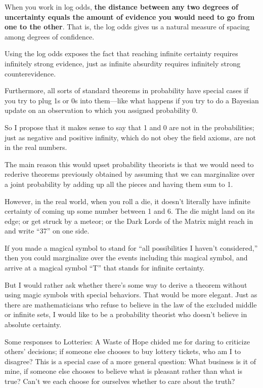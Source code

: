 {
 When you work in log odds, \textbf{the distance between any two
degrees of uncertainty equals the amount of evidence you would need to
go from one to the other}. That is, the log odds gives us a natural
measure of spacing among degrees of confidence.}

{
 Using the log odds exposes the fact that reaching infinite
certainty requires infinitely strong evidence, just as infinite
absurdity requires infinitely strong counterevidence.}

{
 Furthermore, all sorts of standard theorems in probability have
special cases if you try to plug 1s or 0s into them---like what happens
if you try to do a Bayesian update on an observation to which you
assigned probability 0.}

{
 So I propose that it makes sense to say that 1 and 0 are not in
the probabilities; just as negative and positive infinity, which do not
obey the field axioms, are not in the real numbers.}

{
 The main reason this would upset probability theorists is that we
would need to rederive theorems previously obtained by assuming that we
can marginalize over a joint probability by adding up all the pieces
and having them sum to 1.}

{
 However, in the real world, when you roll a die, it
doesn't literally have infinite certainty of coming up
some number between 1 and 6. The die might land on its edge; or get
struck by a meteor; or the Dark Lords of the Matrix might reach in and
write ``37'' on one side.}

{
 If you made a magical symbol to stand for ``all
possibilities I haven't considered,''
then you could marginalize over the events including this magical
symbol, and arrive at a magical symbol
``T'' that stands for infinite
certainty.}

{
 But I would rather ask whether there's some way to
derive a theorem without using magic symbols with special behaviors.
That would be more elegant. Just as there are mathematicians who refuse
to believe in the law of the excluded middle or infinite sets, I would
like to be a probability theorist who doesn't believe
in absolute certainty.}

\myendsectiontext


{
 Some responses to Lotteries: A Waste of Hope chided me for daring
to criticize others' decisions; if someone else chooses
to buy lottery tickets, who am I to disagree? This is a special case of
a more general question: What business is it of mine, if someone else
chooses to believe what is pleasant rather than what is true?
Can't we each choose for ourselves whether to care
about the truth? }

